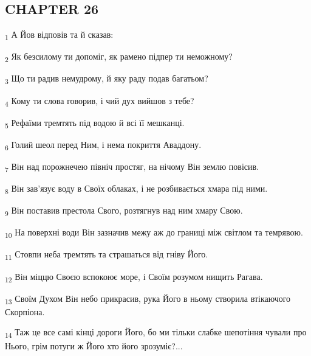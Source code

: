 \subsection{CHAPTER 26}
\begin{tcolorbox}
\textsubscript{1} А Йов відповів та й сказав:
\end{tcolorbox}
\begin{tcolorbox}
\textsubscript{2} Як безсилому ти допоміг, як рамено підпер ти неможному?
\end{tcolorbox}
\begin{tcolorbox}
\textsubscript{3} Що ти радив немудрому, й яку раду подав багатьом?
\end{tcolorbox}
\begin{tcolorbox}
\textsubscript{4} Кому ти слова говорив, і чий дух вийшов з тебе?
\end{tcolorbox}
\begin{tcolorbox}
\textsubscript{5} Рефаїми тремтять під водою й всі її мешканці.
\end{tcolorbox}
\begin{tcolorbox}
\textsubscript{6} Голий шеол перед Ним, і нема покриття Аваддону.
\end{tcolorbox}
\begin{tcolorbox}
\textsubscript{7} Він над порожнечею північ простяг, на нічому Він землю повісив.
\end{tcolorbox}
\begin{tcolorbox}
\textsubscript{8} Він зав'язує воду в Своїх облаках, і не розбивається хмара під ними.
\end{tcolorbox}
\begin{tcolorbox}
\textsubscript{9} Він поставив престола Свого, розтягнув над ним хмару Свою.
\end{tcolorbox}
\begin{tcolorbox}
\textsubscript{10} На поверхні води Він зазначив межу аж до границі між світлом та темрявою.
\end{tcolorbox}
\begin{tcolorbox}
\textsubscript{11} Стовпи неба тремтять та страшаться від гніву Його.
\end{tcolorbox}
\begin{tcolorbox}
\textsubscript{12} Він міццю Своєю вспокоює море, і Своїм розумом нищить Рагава.
\end{tcolorbox}
\begin{tcolorbox}
\textsubscript{13} Своїм Духом Він небо прикрасив, рука Його в ньому створила втікаючого Скорпіона.
\end{tcolorbox}
\begin{tcolorbox}
\textsubscript{14} Таж це все самі кінці дороги Його, бо ми тільки слабке шепотіння чували про Нього, грім потуги ж Його хто його зрозуміє?...
\end{tcolorbox}
